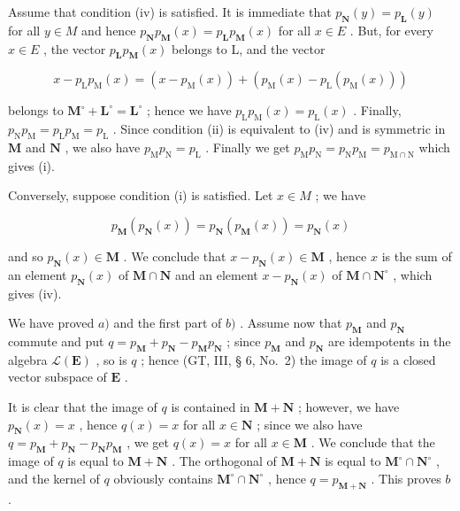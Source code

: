 Assume that condition (iv) is satisfied. It is immediate that \(p_{\mathbf{N}}(y) = p_{\mathbf{L}}(y)\) for all \(y \in M\) and hence \(p_{\mathbf{N}}p_{\mathbf{M}}(x) = p_{\mathbf{L}}p_{\mathbf{M}}(x)\) for all \(x \in E\) . But, for every \(x \in E\) , the vector \(p_{\mathbf{L}}p_{\mathbf{M}}(x)\) belongs to L, and the vector

\[
x - p _ {\mathrm{L}} p _ {\mathrm{M}} (x) = \left(x - p _ {\mathrm{M}} (x)\right) + \left(p _ {\mathrm{M}} (x) - p _ {\mathrm{L}} \left(p _ {\mathrm{M}} (x)\right)\right)
\]

belongs to \(\mathbf{M}^{\circ} + \mathbf{L}^{\circ} = \mathbf{L}^{\circ}\) ; hence we have \(p_{\mathrm{L}}p_{\mathrm{M}}(x) = p_{\mathrm{L}}(x)\) . Finally, \(p_{\mathrm{N}}p_{\mathrm{M}} = p_{\mathrm{L}}p_{\mathrm{M}} = p_{\mathrm{L}}\) . Since condition (ii) is equivalent to (iv) and is symmetric in \(\mathbf{M}\) and \(\mathbf{N}\) , we also have \(p_{\mathrm{M}}p_{\mathrm{N}} = p_{\mathrm{L}}\) . Finally we get \(p_{\mathrm{M}}p_{\mathrm{N}} = p_{\mathrm{N}}p_{\mathrm{M}} = p_{\mathrm{M}\cap \mathrm{N}}\) which gives (i).

Conversely, suppose condition (i) is satisfied. Let \(x \in M\) ; we have

\[
p _ {\mathbf {M}} (p _ {\mathbf {N}} (x)) = p _ {\mathbf {N}} (p _ {\mathbf {M}} (x)) = p _ {\mathbf {N}} (x)
\]

and so \(p_{\mathbf{N}}(x) \in \mathbf{M}\) . We conclude that \(x - p_{\mathbf{N}}(x) \in \mathbf{M}\) , hence \(x\) is the sum of an element \(p_{\mathbf{N}}(x)\) of \(\mathbf{M} \cap \mathbf{N}\) and an element \(x - p_{\mathbf{N}}(x)\) of \(\mathbf{M} \cap \mathbf{N}^{\circ}\) , which gives (iv).

We have proved \(a)\) and the first part of \(b)\) . Assume now that \(p_{\mathbf{M}}\) and \(p_{\mathbf{N}}\) commute and put \(q = p_{\mathbf{M}} + p_{\mathbf{N}} - p_{\mathbf{M}}p_{\mathbf{N}}\) ; since \(p_{\mathbf{M}}\) and \(p_{\mathbf{N}}\) are idempotents in the algebra \(\mathcal{L}(\mathbf{E})\) , so is \(q\) ; hence (GT, III, § 6, No.~2) the image of \(q\) is a closed vector subspace of \(\mathbf{E}\) .

It is clear that the image of \(q\) is contained in \(\mathbf{M} + \mathbf{N}\) ; however, we have \(p_{\mathbf{N}}(x) = x\) , hence \(q(x) = x\) for all \(x \in \mathbf{N}\) ; since we also have \(q = p_{\mathbf{M}} + p_{\mathbf{N}} - p_{\mathbf{N}}p_{\mathbf{M}}\) , we get \(q(x) = x\) for all \(x \in \mathbf{M}\) . We conclude that the image of \(q\) is equal to \(\mathbf{M} + \mathbf{N}\) . The orthogonal of \(\mathbf{M} + \mathbf{N}\) is equal to \(\mathbf{M}^{\circ} \cap \mathbf{N}^{\circ}\) , and the kernel of \(q\) obviously contains \(\mathbf{M}^{\circ} \cap \mathbf{N}^{\circ}\) , hence \(q = p_{\mathbf{M} + \mathbf{N}}\) . This proves \(b\) .

